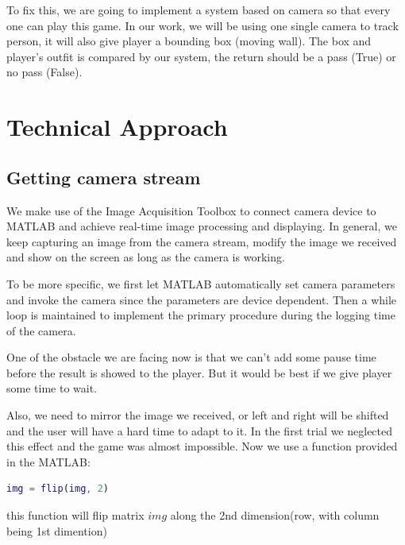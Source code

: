 \documentclass[conference,compsoc]{IEEEtran}
\begin{document}
	\par
		To fix this, we are going to implement a system based on camera so that every one can play this game.
		In our work, we will be using one single camera to track person, it will also give player a bounding box (moving wall).
		The box and player's outfit is compared by our system, the return should be a pass (True) or no pass (False).
\section{Technical Approach}
	\subsection{Getting camera stream}
	\par
	We make use of the Image Acquisition Toolbox to connect camera device to MATLAB and achieve real-time image processing and displaying. In general, we keep capturing an image from the camera stream, modify the image we received and show on the screen as long as the camera is working.
	\par
	To be more specific, we first let MATLAB automatically set camera parameters and invoke the camera since the parameters are device dependent. Then a while loop is maintained to implement the primary procedure during the logging time of the camera.
	\par
	One of the obstacle we are facing now is that we can't add some pause time before the result is showed to the player. But it would be best if we give player some time to wait.
	\par
	Also, we need to mirror the image we received, or left and right will be shifted and the user will have a hard time to adapt to it.
	In the first trial we neglected this effect and the game was almost impossible. Now we use a function provided in the MATLAB:
	\begin{lstlisting}[language = MATLAB]
		img = flip(img, 2)\end{lstlisting}
	this function will flip matrix $img$ along the 2nd dimension(row, with column being 1st dimention)
\end{document}

